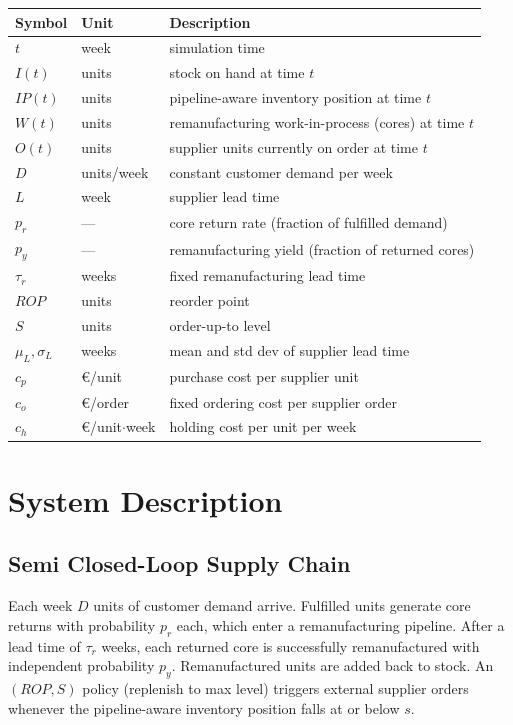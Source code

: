 \documentclass[11pt]{article}
\begin{document}
\begin{tabular}{lll}
\toprule
Symbol & Unit & Description \\
\midrule
$t$             & week       & simulation time \\
$I(t)$          & units      & stock on hand at time $t$ \\
$IP(t)$         & units      & pipeline-aware inventory position at time $t$ \\
$W(t)$          & units      & remanufacturing work-in-process (cores) at time $t$ \\
$O(t)$          & units      & supplier units currently on order at time $t$ \\
$D$             & units/week & constant customer demand per week \\
$L$             & week       & supplier lead time \\
$p_r$           & ---        & core return rate (fraction of fulfilled demand) \\
$p_y$           & ---        & remanufacturing yield (fraction of returned cores) \\
$\tau_r$        & weeks      & fixed remanufacturing lead time \\
$ROP$             & units      & reorder point \\
$S$             & units      & order-up-to level \\
$\mu_L,\sigma_L$& weeks      & mean and std dev of supplier lead time \\
$c_p$           & \euro/unit    & purchase cost per supplier unit \\
$c_o$           & \euro/order   & fixed ordering cost per supplier order \\
$c_h$           & \euro/unit$\cdot$week & holding cost per unit per week \\
\bottomrule
\end{tabular}

\section{System Description}

\subsection{Semi Closed-Loop Supply Chain}

Each week $D$ units of customer demand arrive.  Fulfilled units generate core
returns with probability $p_r$ each, which enter a remanufacturing pipeline.
After a lead time of $\tau_r$ weeks, each returned core is successfully
remanufactured with independent probability $p_y$.  Remanufactured units are
added back to stock.  An $(ROP,S)$ policy (replenish to max level) triggers external supplier orders
whenever the pipeline-aware inventory position falls at or below $s$. 
\end{document}

